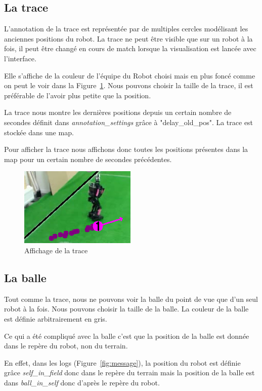 \subsection{La trace}

L'annotation de la trace est représentée par de multiples cercles
modélisant les anciennes positions du robot. 
La trace ne peut être visible que sur un robot à la fois, il peut
être changé en cours de match lorsque la visualisation est lancée
avec l'interface. 
\bigskip

Elle s'affiche de la couleur de l'équipe du Robot choisi mais en
plus foncé comme on peut le voir dans la Figure~\ref{fig:trace}.
Nous pouvons choisir la taille de la trace, il est préférable de 
l'avoir plus petite que la position.


La trace nous montre les dernières positions depuis un certain 
nombre de secondes définit dans \textit{annotation\_settings} 
grâce à "delay\_old\_pos". La trace est stockée dans une map.
\bigskip

Pour afficher la trace nous affichons donc toutes les positions 
présentes dans la map pour un certain nombre de secondes 
précédentes.
\bigskip

\begin{figure}[h] 
\centering 
\includegraphics[scale = 0.5]{images/robottrace.png}
    \caption{Affichage de la trace}
    \label{fig:trace}
\end{figure}

\subsection{La balle}

Tout comme la trace, nous ne pouvons voir la balle du point de 
vue que d'un seul robot à la fois. Nous pouvons choisir la taille
de la balle. La couleur de la balle est définie arbitrairement en
gris.
\bigskip

Ce qui a été compliqué avec la balle c'est que la position de la 
balle est donnée dans le repère du robot, non du terrain. 

En effet, dans les logs (Figure~\ref{fig:message}), la position 
du robot est définie grâce \textit{self\_in\_field} donc dans le 
repère du terrain mais la position de la balle est dans 
\textit{ball\_in\_self} donc d'après le repère du robot.
\bigskip

